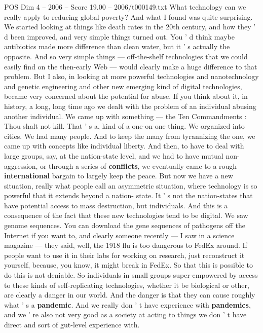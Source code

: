 \begin{textsample}{POS Dim 4 – 2006 – Score 19.00 – 2006/t000149.txt}  \label{ex:f4_pos_007}
What technology can we really apply to reducing global poverty?
And what I found was quite surprising.
We started looking at things like death rates in the 20th century, and how they ' d been improved, and very simple things turned out.
You ' d think maybe antibiotics made more difference than clean water, but it ' s actually the opposite.
And so very simple things — off-the-shelf technologies that we could easily find on the then-early Web — would clearly make a huge difference to that problem.
But I also, in looking at more powerful technologies and nanotechnology and genetic engineering and other new emerging kind of digital technologies, became very concerned about the potential for abuse.
If you think about it, in history, a long, long time ago we dealt with the problem of an individual abusing another individual.
We came up with something — the Ten Commandments : Thou shalt not kill.
That ' s a, kind of a one-on-one thing.
We organized into cities.
We had many people.
And to keep the many from tyrannizing the one, we came up with concepts like individual liberty.
And then, to have to deal with large groups, say, at the nation-state level, and we had to have mutual non- aggression, or through a series of \textbf{conflicts}, we eventually came to a rough \textbf{international} bargain to largely keep the peace.
But now we have a new situation, really what people call an asymmetric situation, where technology is so powerful that it extends beyond a nation- state.
It ' s not the nation-states that have potential access to mass destruction, but individuals.
And this is a consequence of the fact that these new technologies tend to be digital.
We saw genome sequences.
You can download the gene sequences of pathogens off the Internet if you want to, and clearly someone recently — I saw in a science magazine — they said, well, the 1918 flu is too dangerous to FedEx around.
If people want to use it in their labs for working on research, just reconstruct it yourself, because, you know, it might break in FedEx.
So that this is possible to do this is not deniable.
So individuals in small groups super-empowered by access to these kinds of self-replicating technologies, whether it be biological or other, are clearly a danger in our world.
And the danger is that they can cause roughly what ' s a \textbf{pandemic}.
And we really don ' t have experience with \textbf{pandemics}, and we ' re also not very good as a society at acting to things we don ' t have direct and sort of gut-level experience with.

\end{textsample}

